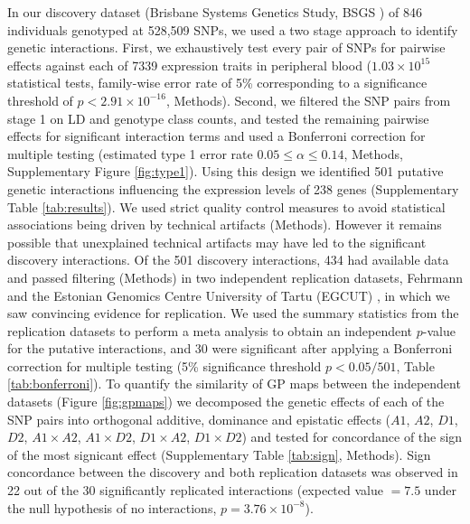 \documentclass{article}
\begin{document}
In our discovery dataset (Brisbane Systems Genetics Study, BSGS \cite{Powell2012}) of 846 individuals genotyped at 528,509 SNPs, we used a two stage approach to identify genetic interactions. First, we exhaustively test every pair of SNPs for pairwise effects against each of 7339 expression traits in peripheral blood ($1.03 \times 10^{15}$ statistical tests, family-wise error rate of 5\% corresponding to a significance threshold of $ p < 2.91 \times 10^{-16}$, Methods). Second, we filtered the SNP pairs from stage 1 on LD and genotype class counts, and tested the remaining pairwise effects for significant interaction terms and used a Bonferroni correction for multiple testing (estimated type 1 error rate $0.05 \leq \alpha \leq 0.14$, Methods, Supplementary Figure \ref{fig:type1}). Using this design we identified 501 putative genetic interactions influencing the expression levels of 238 genes (Supplementary Table \ref{tab:results}). We used strict quality control measures to avoid statistical associations being driven by technical artifacts (Methods). However it remains possible that unexplained technical artifacts may have led to the significant discovery interactions. Of the 501 discovery interactions, 434 had available data and passed filtering (Methods) in two independent replication datasets, Fehrmann \cite{Fehrmann2011} and the Estonian Genomics Centre University of Tartu (EGCUT) \cite{Metspalu2004}, in which we saw convincing evidence for replication. We used the summary statistics from the replication datasets to perform a meta analysis to obtain an independent $p$-value for the putative interactions, and 30 were significant after applying a Bonferroni correction for multiple testing (5\% significance threshold $p < 0.05/501$, Table \ref{tab:bonferroni}). To quantify the similarity of GP maps between the independent datasets (Figure \ref{fig:gpmaps}) we decomposed the genetic effects of each of the SNP pairs into orthogonal additive, dominance and epistatic effects ($A1$, $A2$, $D1$, $D2$, $A1 \times A2$, $A1 \times D2$, $D1 \times A2$, $D1 \times D2$) and tested for concordance of the sign of the most signicant effect (Supplementary Table \ref{tab:sign}, Methods). Sign concordance between the discovery and both replication datasets was observed in 22 out of the 30 significantly replicated interactions (expected value $= 7.5$ under the null hypothesis of no interactions, $p = 3.76 \times 10^{-8}$). 
\end{document}
